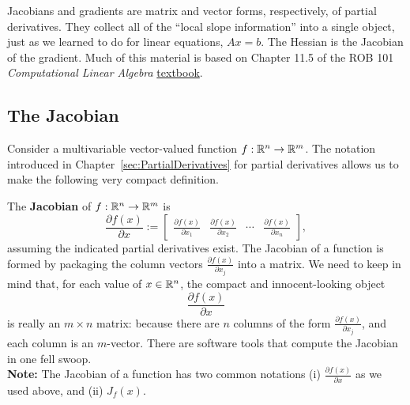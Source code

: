 Jacobians and gradients are matrix and vector forms, respectively, of partial derivatives. They collect all of the ``local slope information'' into a single object, just as we learned to do for linear equations, $A x = b$. The Hessian is the Jacobian of the gradient. Much of this material is based on Chapter 11.5 of the ROB 101 \textit{Computational Linear Algebra} 
\href{https://www.dropbox.com/s/1pzva81t4shnd22/ROB_101_Textbook_11April2023.pdf?dl=0}{textbook}. 

\subsection{The Jacobian}

Consider a multivariable vector-valued function $f:\mathbb R^{n} \to \mathbb R^{m}$. The notation introduced in Chapter~\ref{sec:PartialDerivatives} for partial derivatives allows us to make the following very compact definition.

\vspace*{.2cm}

\begin{tcolorbox}[colback=mylightblue, title = {\bf Jacobian of a Function}, breakable]

\begin{definition} 
\label{def:Jacobian}
The \textbf{Jacobian} of $f:\mathbb R^{n} \to \mathbb R^{m}$ is
\begin{equation}
    \label{eq:DefJacobian}
    \frac{\partial f(x)}{\partial x}:=  \left[\begin{array}{cccc}
      \frac{\partial f(x)}{\partial x_1} & \frac{\partial f(x)}{\partial x_2} & \cdots & \frac{\partial f(x)}{\partial x_n}
    \end{array} \right],
\end{equation}
assuming the indicated partial derivatives exist. 
The Jacobian of a function is formed by packaging the column vectors $\frac{\partial f(x)}{\partial x_j}$ into a matrix. We need to keep in mind that, for each value of $x\in \mathbb R^{n}$, the compact and innocent-looking object
$$ \frac{\partial f(x)}{\partial x} $$
is really an $m \times n$ matrix: because there are $n$ columns of the form $ \frac{\partial f(x)}{\partial x_j}$, and each column is an $m$-vector. There are software tools that compute the Jacobian in one fell swoop. \\

\textbf{Note:} The Jacobian of a function has two common notations (i) $\frac{\partial f(x)}{\partial x}$ as we used above, and (ii) $J_f(x)$. 

\end{definition}
\end{tcolorbox}

